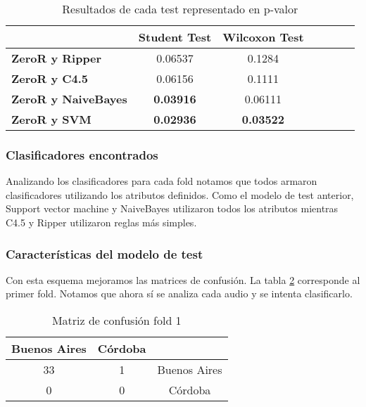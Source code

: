 \begin{table}[H]
	\centering
	\begin{tabular}{|l|c|c|c|c|c|c|}
		\hline
		\textbf{}  & \textbf{Student Test} & \textbf{Wilcoxon Test} \\ \hline
		\textbf{ZeroR y Ripper}  & 0.06537 & 0.1284 \\ \hline
		\textbf{ZeroR y C4.5}  & 0.06156 &  0.1111 \\ \hline
		\textbf{ZeroR y NaiveBayes}  & \textbf{0.03916} & 0.06111 \\ \hline
		\textbf{ZeroR y SVM}  &  \textbf{0.02936} & \textbf{0.03522} \\ \hline
	\end{tabular}
	\caption{Resultados de cada test representado en p-valor}
	\label{res_tests_wilcoxon_student}
\end{table}

\subsubsection{Clasificadores encontrados}

Analizando los clasificadores para cada fold notamos que todos armaron clasificadores utilizando los atributos definidos. Como el modelo de test anterior, Support vector machine y NaiveBayes utilizaron todos los atributos mientras C4.5 y Ripper utilizaron reglas más simples.

\subsubsection{Características del modelo de test}

Con esta esquema mejoramos las matrices de confusión. La tabla \ref{mat_conf_f1} corresponde al primer fold. Notamos que ahora sí se analiza cada audio y se intenta clasificarlo. 

\begin{table}[H]
	\centering
	\begin{tabular}{|c|c|c|}
		\hline
		Buenos Aires & Córdoba & \\ \hline
		33 & 1 & Buenos Aires\\ \hline
		0 & 0 & Córdoba\\ \hline
	\end{tabular}
	\caption{Matriz de confusión fold 1}
	\label{mat_conf_f1}
\end{table}

